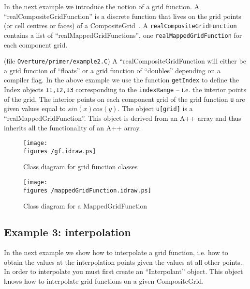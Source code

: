 \documentclass{article}
\begin{document}
In the next example we introduce the notion of a grid function.
A ``realCompositeGridFunction'' is a discrete function that lives
on the grid points (or cell centres or faces)
of a CompositeGrid~\cite{GF}. A {\tt realCompositeGridFunction}
contains a list of ``realMappedGridFunctions'', one {\tt realMappedGridFunction}
for each component grid. 

(file {\tt Overture/primer/example2.C})
{\footnotesize
{}
}
A ``realCompositeGridFunction will either
be a grid function of ``floats'' or a grid function of ``doubles''
depending on a compiler flag. 
In the above example we use the function {\tt getIndex} to
define the Index objects {\tt I1,I2,I3}
corresponding to the {\tt indexRange} -- i.e. the interior
points of the grid. The interior points on each
component grid of the grid function {\tt u} are given values
equal to $sin(x) cos(y)$. The object {\tt u[grid]} is a 
``realMappedGridFunction''. This object is derived from an
A++ array and thus inherits all the functionality of an
A++ array.


\begin{figure} 
  \begin{center}
  \texttt{[image: \\figures /gf.idraw.ps]}
  \caption{Class diagram for grid function classes} \label{fig:GridFunctions}
  \end{center}
\end{figure}


\begin{figure}
  \begin{center}
  \texttt{[image: \\figures /mappedGridFunction.idraw.ps]}
  \caption{Class diagram for a MappedGridFunction}
  \end{center}\label{fig:MappedGridFunction}
\end{figure}

\vfill\eject
\subsection{Example 3: interpolation}

In the next example we show how to interpolate a grid function, i.e. how to
obtain the values at the interpolation points given the values at all other
points. In order to interpolate you must first create an ``Interpolant''
object. This object knows how to interpolate grid functions on a 
given CompositeGrid. 
\end{document}
